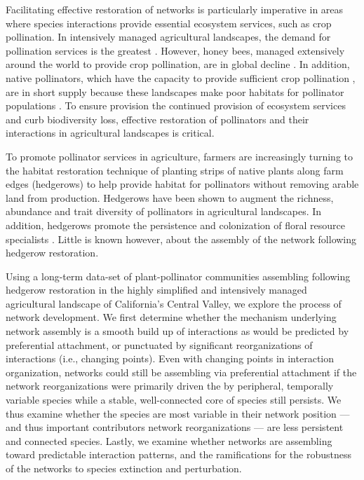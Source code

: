 \documentclass[12pt]{article}
\begin{document}
Facilitating effective restoration of networks is particularly
imperative in areas where species interactions provide essential
ecosystem services, such as crop pollination. In intensively managed
agricultural landscapes, the demand for pollination services is the
greatest \citep{kremen-2008-10}. However, honey bees, managed
extensively around the world to provide crop pollination, are in
global decline \citep{neumann-2010-1, van-engelsdorp-2009-e6481}. In
addition, native pollinators, which have the capacity to provide
sufficient crop pollination \citep{kremen-2002-16816,
  winfree-2007-1105, kremen-2004-1109}, are in short supply because
these landscapes make poor habitats for pollinator populations
\citep{kremen-2002-16816}. To ensure provision the continued provision
of ecosystem services and curb biodiversity loss, effective
restoration of pollinators and their interactions in agricultural
landscapes is critical.

To promote pollinator services in agriculture, farmers are
increasingly turning to the habitat restoration technique of planting
strips of native plants along farm edges (hedgerows) to help provide
habitat for pollinators without removing arable land from
production. Hedgerows have been shown to augment the richness,
abundance and trait diversity of pollinators in agricultural
landscapes\citep{morandin-2013-829, mgonigle-2015-x, kremen-2015-602,
  ponisio2015farm}. In addition, hedgerows promote the persistence and
colonization of floral resource specialists
\citep{mgonigle-2015-x}. Little is known however, about the assembly
of the network following hedgerow restoration. 

Using a long-term data-set of plant-pollinator communities assembling
following hedgerow restoration in the highly simplified and
intensively managed agricultural landscape of California's Central
Valley, we explore the process of network development. We first
determine whether the mechanism underlying network assembly is a
smooth build up of interactions as would be predicted by preferential
attachment, or punctuated by significant reorganizations of
interactions (i.e., changing points). Even with changing points in
interaction organization, networks could still be assembling via
preferential attachment if the network reorganizations were primarily
driven the by peripheral, temporally variable species while a stable,
well-connected core of species still persists. We thus examine whether
the species are most variable in their network position --- and thus
important contributors network reorganizations --- are less persistent
and connected species. %
Lastly, we examine whether networks are assembling toward predictable
interaction patterns, and the ramifications for the robustness of the
networks to species extinction and perturbation.  
\end{document}
